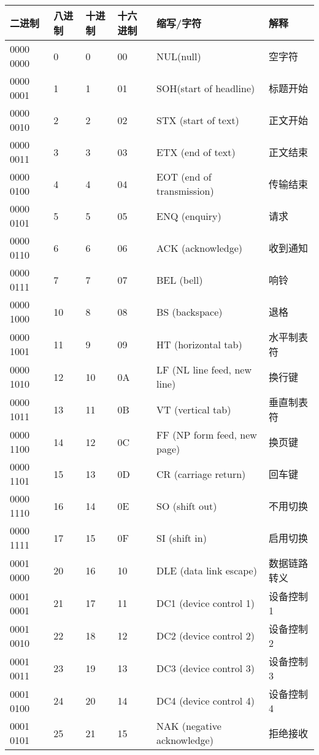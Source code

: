 \begin{longtable}{| p{.10\linewidth} | p{.08\linewidth} | p{.08\linewidth} | p{.10\linewidth} | p{.28\linewidth} | p{.15\linewidth} |}
\hline
\tableheadcolor
\textbf{二进制} & \textbf{八进制} & \textbf{十进制} & \textbf{十六进制} & \textbf{缩写/字符} & \textbf{解释} \\
\hline
0000 0000 & 0 & 0 & 00 & NUL(null) & 空字符 \\ \hline
0000 0001 & 1 & 1 & 01 & SOH(start of headline) & 标题开始 \\ \hline
0000 0010 & 2 & 2 & 02 & STX (start of text) & 正文开始 \\ \hline
0000 0011 & 3 & 3 & 03 & ETX (end of text) & 正文结束 \\ \hline
0000 0100 & 4 & 4 & 04 & EOT (end of transmission) & 传输结束 \\ \hline
0000 0101 & 5 & 5 & 05 & ENQ (enquiry) & 请求 \\ \hline
0000 0110 & 6 & 6 & 06 & ACK (acknowledge) & 收到通知 \\ \hline
0000 0111 & 7 & 7 & 07 & BEL (bell) & 响铃 \\ \hline
0000 1000 & 10 & 8 & 08 & BS (backspace) & 退格 \\ \hline
0000 1001 & 11 & 9 & 09 & HT (horizontal tab) & 水平制表符 \\ \hline
0000 1010 & 12 & 10 & 0A & LF (NL line feed, new line) & 换行键 \\ \hline
0000 1011 & 13 & 11 & 0B & VT (vertical tab) & 垂直制表符 \\ \hline
0000 1100 & 14 & 12 & 0C & FF (NP form feed, new page) & 换页键 \\ \hline
0000 1101 & 15 & 13 & 0D & CR (carriage return) & 回车键 \\ \hline
0000 1110 & 16 & 14 & 0E & SO (shift out) & 不用切换 \\ \hline
0000 1111 & 17 & 15 & 0F & SI (shift in) & 启用切换 \\ \hline
0001 0000 & 20 & 16 & 10 & DLE (data link escape) & 数据链路转义 \\ \hline
0001 0001 & 21 & 17 & 11 & DC1 (device control 1) & 设备控制1 \\ \hline
0001 0010 & 22 & 18 & 12 & DC2 (device control 2) & 设备控制2 \\ \hline
0001 0011 & 23 & 19 & 13 & DC3 (device control 3) & 设备控制3 \\ \hline
0001 0100 & 24 & 20 & 14 & DC4 (device control 4) & 设备控制4 \\ \hline
0001 0101 & 25 & 21 & 15 & NAK (negative acknowledge) & 拒绝接收 \\ \hline

\end{longtable}
